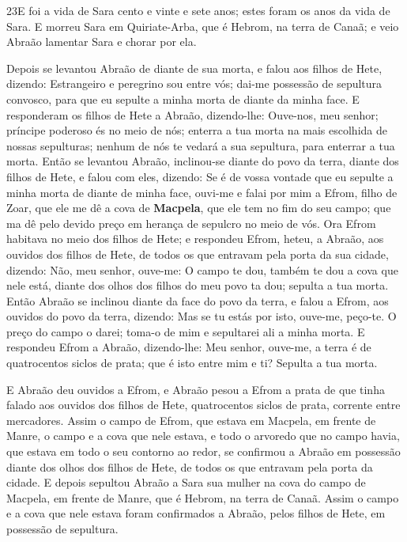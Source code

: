 \smallskip

\lettrine{23} E foi a vida de Sara cento e vinte e sete anos;
estes foram os anos da vida de Sara. E morreu Sara em
Quiriate-Arba, que é Hebrom, na terra de Canaã; e veio Abraão
lamentar Sara e chorar por ela.

Depois se levantou Abraão de diante de sua morta, e falou aos
filhos de Hete, dizendo: Estrangeiro e peregrino sou entre vós;
dai-me possessão de sepultura convosco, para que eu sepulte a minha
morta de diante da minha face. E responderam os filhos de Hete a
Abraão, dizendo-lhe: Ouve-nos, meu senhor; príncipe poderoso és
no meio de nós; enterra a tua morta na mais escolhida de nossas
sepulturas; nenhum de nós te vedará a sua sepultura, para enterrar a
tua morta. Então se levantou Abraão, inclinou-se diante do povo
da terra, diante dos filhos de Hete, e falou com eles, dizendo:
Se é de vossa vontade que eu sepulte a minha morta de diante de
minha face, ouvi-me e falai por mim a Efrom, filho de Zoar, que
ele me dê a cova de \textbf{Macpela}, que ele tem no fim do seu
campo; que ma dê pelo devido preço em herança de sepulcro no meio de
vós. Ora Efrom habitava no meio dos filhos de Hete; e
respondeu Efrom, heteu, a Abraão, aos ouvidos dos filhos de Hete, de
todos os que entravam pela porta da sua cidade, dizendo: Não,
meu senhor, ouve-me: O campo te dou, também te dou a cova que nele
está, diante dos olhos dos filhos do meu povo ta dou; sepulta a tua
morta. Então Abraão se inclinou diante da face do povo da
terra, e falou a Efrom, aos ouvidos do povo da terra,
dizendo: Mas se tu estás por isto, ouve-me, peço-te. O preço do
campo o darei; toma-o de mim e sepultarei ali a minha morta.
E respondeu Efrom a Abraão, dizendo-lhe: Meu senhor,
ouve-me, a terra é de quatrocentos siclos de prata; que é isto entre
mim e ti? Sepulta a tua morta.

E Abraão deu ouvidos a Efrom, e Abraão pesou a Efrom a prata de
que tinha falado aos ouvidos dos filhos de Hete, quatrocentos siclos
de prata, corrente entre mercadores. Assim o campo de Efrom,
que estava em Macpela, em frente de Manre, o campo e a cova que nele
estava, e todo o arvoredo que no campo havia, que estava em todo o
seu contorno ao redor, se confirmou a Abraão em possessão
diante dos olhos dos filhos de Hete, de todos os que entravam pela
porta da cidade. E depois sepultou Abraão a Sara sua mulher
na cova do campo de Macpela, em frente de Manre, que é Hebrom, na
terra de Canaã. Assim o campo e a cova que nele estava foram
confirmados a Abraão, pelos filhos de Hete, em possessão de
sepultura.

